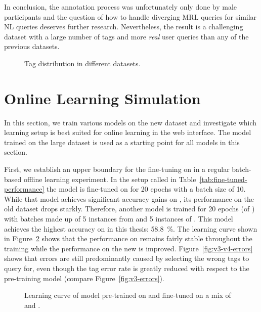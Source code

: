 In conclusion, the annotation process was unfortunately only done by male
participants and the question of how to handle diverging MRL queries for similar
NL queries deserves further research. Nevertheless, the result is a challenging
dataset with a large number of tags and more \emph{real} user queries than any
of the previous \nlmaps{} datasets.

\begin{figure}[h]
  \centering
  \resizebox{\textwidth}{!}{}
  \caption[Tag distribution]{Tag distribution in different \nlmaps{} datasets.}
  \label{fig:tag-distribution}
\end{figure}

\section{Online Learning Simulation}
\label{sec:online-simulation}

In this section, we train various models on the new \nlmapsfour{} dataset and
investigate which learning setup is best suited for online learning in the web
interface. The model trained on the large \nlmapsthree{} dataset is used as a
starting point for all models in this section.

First, we establish an upper boundary for the fine-tuning on \nlmfour{} in a
regular batch-based offline learning experiment. In the setup called \nlmthree{}
\textrightarrow{} \nlmfour{} in Table~\ref{tab:fine-tuned-performance} the model
is fine-tuned on \nlmfour{} for \num{20} epochs with a batch size of \num{10}.
While that model achieves significant accuracy gains on \nlmfour{}, its
performance on the old dataset \nlmthree{} drops starkly. Therefore, another
model is trained for \num{20} epochs (of \nlmfour{}) with batches made up of
\num{5} instances from \nlmfour{} and \num{5} instances of \nlmthree{}. This
model achieves the highest accuracy on \nlmfour{} in this thesis: \SI{58.8}{\%}.
The learning curve shown in Figure~\ref{fig:v3-v4-learning-curve} shows that the
performance on \nlmthree{} remains fairly stable throughout the training while
the performance on the new \nlmfour{} is improved. Figure~\ref{fig:v3-v4-errors}
shows that errors are still predominantly caused by selecting the wrong tags to
query for, even though the tag error rate is greatly reduced with respect to the
pre-training model (compare Figure~\ref{fig:v3-errors}).

\begin{figure}[h]
  \centering
  \resizebox{\textwidth}{!}{}
  \caption[\nlmthree{}+\nlmfour{} learning curve]{Learning curve of model
    pre-trained on \nlmapsthree{} and fine-tuned on a mix of \nlmapsthree{} and
    \nlmapsfour{}.}
  \label{fig:v3-v4-learning-curve}
\end{figure}

